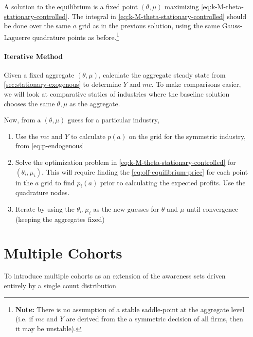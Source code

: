 \documentclass[12pt]{article}
\begin{document}
A solution to the equilibrium is a fixed point $(\theta, \mu)$ maximizing \cref{eq:k-M-theta-stationary-controlled}.  The integral in \cref{eq:k-M-theta-stationary-controlled} should be done over the same $a$ grid as in the previous solution, using the same Gauss-Laguerre quadrature points as before.\footnote{\textbf{Note:} There is no assumption of a stable saddle-point at the aggregate level (i.e. if $mc$ and $Y$ are derived from the a symmetric decision of all firms, then it may be unstable).}

\paragraph{Iterative Method}
Given a fixed aggregate $(\theta, \mu)$, calculate the aggregate steady state from \cref{sec:stationary-exogenous} to determine $Y$ and $mc$.  To make comparisons easier, we will look at comparative statics of industries where the baseline solution chooses the same $\theta, \mu$ as the aggregate.

Now, from a $(\theta, \mu)$ guess for a particular industry,
\begin{enumerate}
	\item Use the $mc$ and $Y$ to calculate $p(a)$ on the grid for the symmetric industry, from \cref{eq:p-endogenous}
	\item Solve the optimization problem in \cref{eq:k-M-theta-stationary-controlled} for $(\theta_i,\mu_i)$.  This will require finding the \cref{eq:off-equilibrium-price} for each point in the $a$ grid to find $p_i(a)$ prior to calculating the expected profits.  Use the quadrature nodes.
	\item Iterate by using the $\theta_i, \mu_i$ as the new guesses for $\theta$ and $\mu$ until convergence (keeping the aggregates fixed)
\end{enumerate}

\section{Multiple Cohorts}
To introduce multiple cohorts as an extension of the awareness sets driven entirely by a single count distribution
\end{document}
